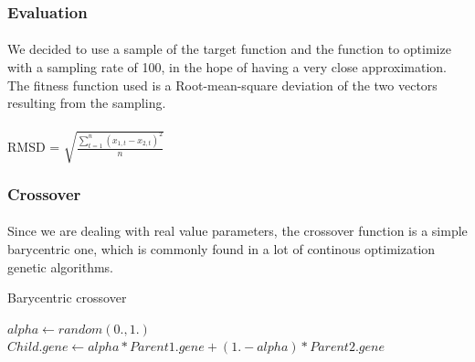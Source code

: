 \documentclass{article}
\begin{document}

    \subsubsection{Evaluation} %
    \label{ssub:Evaluation}
      
      \paragraph{} %
      \label{par:}
        We decided to use a sample of the target function and the function to optimize
        with a sampling rate of 100, in the hope of having a very close approximation. 
        The fitness function used is a Root-mean-square deviation of the two vectors
        resulting from the sampling.
        \\
        \\
        RMSD = $\sqrt{\frac{\sum_{t=1}^n (x_{1,t} - x_{2,t})^2}{n}}$

    
    \subsubsection{Crossover} %
    \label{ssub:Crossover}
      
      \paragraph{} %
      \label{par:}
      
        Since we are dealing with real value parameters, the crossover function
        is a simple barycentric one, which is commonly found in a lot of continous
        optimization genetic algorithms.
      
      \begin{algorithm}
      \caption{Barycentric crossover}\label{pseudo1}
      \begin{algorithmic}[1]
        \State $alpha\gets random(0.,1.)$ 
        \State $Child.gene\gets alpha * Parent1.gene + (1. - alpha) * Parent2.gene$
      \EndFor
      \EndProcedure
      \end{algorithmic}
      \end{algorithm}

    
    
\end{document}
